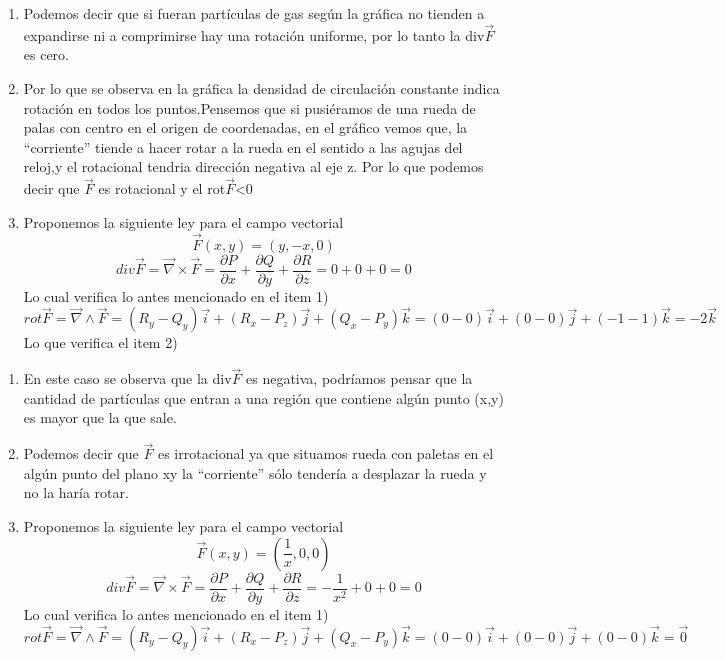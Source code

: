 \documentclass[10pt]{article}
\begin{document}
\begin{enumerate}
	\item Podemos decir que si fueran partículas de gas según la gráfica no tienden a expandirse ni a comprimirse hay una rotación uniforme, por lo tanto la div$\vec{F}$ es cero.
	\item Por lo que se observa en la gráfica la densidad de circulación constante indica rotación en todos los puntos.Pensemos que si pusiéramos de una rueda de palas con centro en el origen de coordenadas, en el gráfico vemos que, la “corriente” tiende a hacer rotar a la rueda en el sentido a las agujas del reloj,y el rotacional tendria dirección negativa al eje z. Por lo que podemos decir que $\vec{F}$  es rotacional y el rot$\vec{F}$<0
	\item Proponemos la siguiente ley para el campo vectorial
		\[ \vec{F}(x,y) = (y,-x,0) \]
		\[ div\vec{F} = \vec{\nabla} \times \vec{F} = \frac{\partial P}{\partial x} + \frac{\partial Q}{\partial y} + \frac{\partial R}{\partial z} = 0 + 0 + 0 = 0 \]
		Lo cual verifica lo antes mencionado en el item 1)
		\[ rot\vec{F} = \vec{\nabla} \wedge \vec{F} = (R_y - Q_y)\vec{i} + (R_x - P_z)\vec{j} + (Q_x - P_y)\vec{k} = (0 - 0)\vec{i} + (0 - 0)\vec{j} + ( -1 - 1)\vec{k} = -2 \vec{k} \]
		Lo que verifica el item 2)

\end{enumerate}

\begin{enumerate}
	\item En este caso se observa que la div$\vec{F}$ es negativa, podríamos pensar que la cantidad de partículas que entran a una región que contiene algún punto (x,y) es mayor que la que sale.
	\item Podemos decir que $\vec{F}$ es irrotacional ya que situamos rueda con paletas en el algún punto del plano xy la “corriente” sólo tendería a desplazar la rueda y no la haría rotar.
	\item Proponemos la siguiente ley para el campo vectorial
		\[ \vec{F}(x,y) = ( \frac{1}{x} ,0,0) \]
		\[ div\vec{F} = \vec{\nabla} \times \vec{F} = \frac{\partial P}{\partial x} + \frac{\partial Q}{\partial y} + \frac{\partial R}{\partial z} = - \frac{1}{x^2}  + 0 + 0 = 0 \]
		Lo cual verifica lo antes mencionado en el item 1)
		\[ rot\vec{F} = \vec{\nabla} \wedge \vec{F} = (R_y - Q_y)\vec{i} + (R_x - P_z)\vec{j} + (Q_x - P_y)\vec{k} = (0 - 0)\vec{i} + (0 - 0)\vec{j} + ( 0 - 0)\vec{k} = \vec{0} \]

\end{enumerate}
\end{document}

